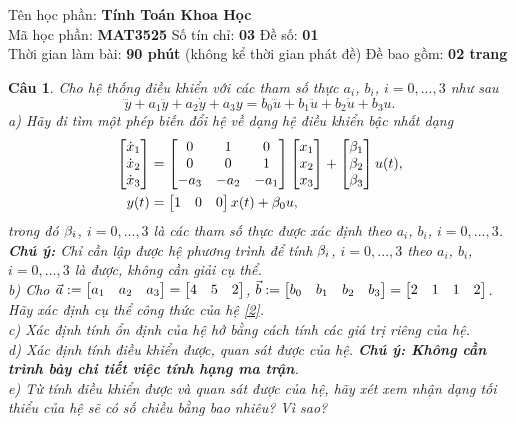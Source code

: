 \documentclass[11pt]{article}
\newtheorem{bt}{Câu}
\begin{document}



\begin{center}
Tên học phần: {\bf Tính Toán Khoa Học} \\ 
Mã học phần: \textbf{MAT3525}	\quad Số tín chỉ: \textbf{03} \quad	Đề số: \textbf{01} \\ 
Thời gian làm bài: \textbf{90 phút} (không kể thời gian phát đề) \quad Đề bao gồm: \textbf{02 trang}
\end{center}

\begin{bt}
Cho hệ thống điều khiển với các tham số thực $a_i$, $b_i$, $i=0,...,3$ như sau
%
\begin{equation}\label{1}
	\dddot{y} + a_1 \ddot{y} + a_2 \dot{y} + a_3 y = b_0 \dddot{u} + b_1 \ddot{u} + b_2 \dot{u} + b_3 u.
\end{equation}
%
a) Hãy đi tìm một phép biến đổi hệ về dạng hệ điều khiển bậc nhất dạng
%
\begin{align}\label{2}
	\begin{bmatrix} \dot{x}_1 \\ \dot{x}_2 \\ \dot{x}_3 \end{bmatrix} &= \begin{bmatrix} 0 & 1 & 0 \\ 0 & 0 & 1 \\ -a_3 & -a_2 & -a_1 \end{bmatrix} \begin{bmatrix} x_1 \\ x_2 \\ x_3 \end{bmatrix} + \begin{bmatrix} \beta_1 \\ \beta_2 \\ \beta_3  \end{bmatrix} u(t), \\
	y(t) &= \begin{bmatrix} 1 & 0 & 0 \end{bmatrix} x(t) + \beta_0 u, 
\end{align}
%
trong đó $\beta_i$, $i=0,...,3$ là các tham số thực được xác định theo $a_i$, $b_i$, $i=0,...,3$. \\
\textbf{Chú ý:} Chỉ cần lập được hệ phương trình để tính $\beta_i$, $i=0,...,3$  theo $a_i$, $b_i$, $i=0,...,3$ là được, không cần giải cụ thể. \\
b) Cho $\vec{a} := \begin{bmatrix} a_1 & a_2 & a_3 \end{bmatrix} = \begin{bmatrix} 4 & 5 & 2 \end{bmatrix}$, $\vec{b} := \begin{bmatrix} b_0 & b_1 & b_2 & b_3 \end{bmatrix} = \begin{bmatrix} 2 & 1 & 1 & 2 \end{bmatrix}$. Hãy xác định cụ thể công thức của hệ \eqref{2}. \\
c) Xác định tính ổn định của hệ hở bằng cách tính các giá trị riêng của hệ. \\
d) Xác định tính điều khiển được, quan sát được của hệ. \textbf{Chú ý: Không cần trình bày chi tiết việc tính hạng ma trận}. \\
e) Từ tính điều khiển được và quan sát được của hệ, hãy xét xem nhận dạng tối thiểu của hệ sẽ có số chiều bằng bao nhiêu? Vì sao?
\end{bt}
\end{document}
